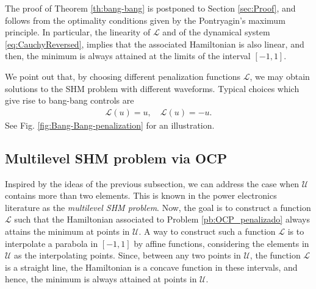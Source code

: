 \documentclass[twocolumn]{autart}    %
\begin{document}
The proof of Theorem \ref{th:bang-bang} is postponed to Section \ref{sec:Proof}, and follows from the optimality conditions given by the Pontryagin's maximum principle. In particular, the linearity of $\mathcal{L}$ and of  the dynamical system \eqref{eq:CauchyReversed}, implies that the associated Hamiltonian is also  linear, and then, the minimum is always attained at the limits of the interval $[-1,1]$.

We point out that, by choosing different penalization functions $\mathcal{L}$, we may obtain solutions to the SHM problem with different waveforms.
Typical choices which give rise to bang-bang controls are 
\begin{align*}
	\mathcal{L}(u) = u,  \quad \mathcal{L}(u) = -u.
\end{align*} 
See Fig. \ref{fig:Bang-Bang-penalization} for an illustration.

\subsection{Multilevel SHM problem via OCP}

Inspired by the ideas of the previous subsection, we can address the case when $\mathcal{U}$ contains more than two elements. This is known in the power electronics literature as the \textit{multilevel SHM problem}. Now, the goal is to construct a function $\mathcal{L}$ such that the Hamiltonian associated to Problem \ref{pb:OCP_penalizado} always attains the minimum at points in $\mathcal{U}$. 
A way to construct such a function $\mathcal{L}$ is to interpolate a parabola in $[-1,1]$ by affine functions, considering the elements in $\mathcal{U}$ as the interpolating points.  Since, between any two points in $\mathcal{U}$,  the function $\mathcal{L}$ is a straight line,  the Hamiltonian is a concave function in these intervals, and hence, the minimum is always attained at points in $\mathcal{U}$.
\end{document}
